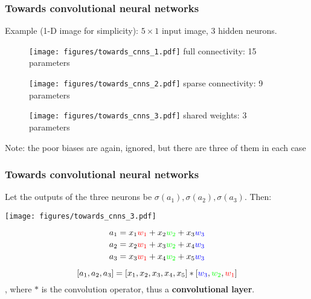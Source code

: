 \documentclass[notes]{beamer}          %
\begin{document}
\begin{frame}
\frametitle{Towards convolutional neural networks}
Example (1-D image for simplicity): $5\times1$ input image, 3 hidden neurons.
\begin{figure}[ht]
        \begin{minipage}[b]{0.3\linewidth}
            \centering
            \texttt{[image: figures/towards\_cnns\_1.pdf]}
            full connectivity: 15 parameters
        \end{minipage}
        \hspace{0.25cm}
        \pause
        \begin{minipage}[b]{0.31\linewidth}
            \centering
            \texttt{[image: figures/towards\_cnns\_2.pdf]}
            sparse connectivity: 9 parameters
        \end{minipage}
        \hspace{0.25cm}
        \pause
        \begin{minipage}[b]{0.3\linewidth}
            \centering
            \texttt{[image: figures/towards\_cnns\_3.pdf]}
            shared weights: 3 parameters
        \end{minipage}
 \end{figure}
 \tiny{Note: the poor biases are again, ignored, but there are three of them in each case}
\end{frame}


\begin{frame}
\frametitle{Towards convolutional neural networks}
Let the outputs of the three neurons be $\sigma(a_1), \sigma(a_2), \sigma(a_3)$. Then:
\begin{center}
\begin{minipage}[b]{0.3\linewidth}
\texttt{[image: figures/towards\_cnns\_3.pdf]}
\end{minipage}
\begin{minipage}[b]{0.45\linewidth}
$$a_1 = x_1 \textcolor{red}{w_1} + x_2 \textcolor{green}{w_2} + x_3 \textcolor{blue}{w_3}$$
$$a_2 = x_2 \textcolor{red}{w_1} + x_3 \textcolor{green}{w_2} + x_4 \textcolor{blue}{w_3}$$
$$a_3 = x_3 \textcolor{red}{w_1} + x_4 \textcolor{green}{w_2} + x_5 \textcolor{blue}{w_3}$$
\vspace{0.5cm}
\end{minipage}
\pause
$$[a_1, a_2, a_3] = [x_1, x_2, x_3, x_4, x_5] * [\textcolor{blue}{w_3}, \textcolor{green}{w_2}, \textcolor{red}{w_1}]$$
, where $*$ is the convolution operator, thus a \textbf{convolutional layer}.
\end{center}
\end{frame}
\end{document}
